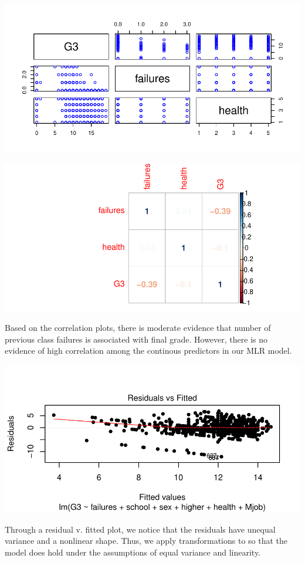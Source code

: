 \documentclass{article}
\begin{document}
\includegraphics{Report_4-018}

\includegraphics{Report_4-019}

Based on the correlation plots, there is moderate evidence that number of previous class failures is associated with final grade. However, there is no evidence of high correlation among the continous predictors in our MLR model. 

\includegraphics{Report_4-020}
\bigskip

Through a residual v. fitted plot, we notice that the residuals have unequal variance and a nonlinear shape. Thus, we apply transformations to so that the model does hold under the assumptions of equal variance and linearity. 
\end{document}
